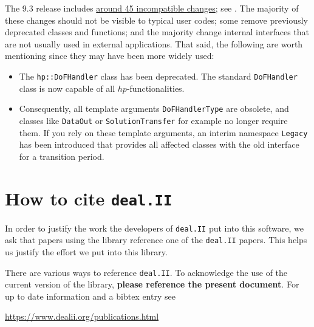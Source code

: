 \documentclass{ansarticle-preprint}
\newcommand{\specialword}[1]{\texttt{#1}}
\newcommand{\dealii}{{\specialword{deal.II}}\xspace}
\begin{document}
The 9.3 release includes
\href{https://dealii.org/developer/doxygen/deal.II/changes_between_9_2_0_and_9_3_0.html}
{around 45 incompatible changes}; see \cite{changes93}. The majority of these changes
should not be visible to typical user codes; some remove previously
deprecated classes and functions; and the majority change internal
interfaces that are not usually used in external
applications. That said, the following are worth mentioning since they
may have been more widely used:
\begin{itemize}
  \item The \texttt{hp::DoFHandler} class has been deprecated. The standard
        \texttt{DoFHandler} class is now capable of all $hp$-functionalities.
  \item Consequently, all template arguments \texttt{DoFHandlerType} are obsolete,
        and classes like \texttt{DataOut} or \texttt{SolutionTransfer} for example
        no longer require them. If you rely on these template arguments, an interim
        namespace \texttt{Legacy} has been introduced that provides all affected
        classes with the old interface for a transition period.
\end{itemize}



\section{How to cite \dealii}\label{sec:cite}

In order to justify the work the developers of \dealii{} put into this
software, we ask that papers using the library reference one of the
\dealii{} papers. This helps us justify the effort we put into this library.

There are various ways to reference \dealii{}. To acknowledge the use of
the current version of the library, \textbf{please reference the present
  document}. For up to date information and a bibtex entry
see
\begin{center}
  \url{https://www.dealii.org/publications.html}
\end{center}
\end{document}
